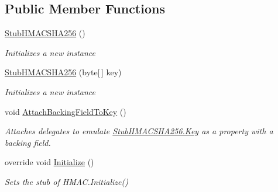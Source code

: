 \subsection*{Public Member Functions}
\begin{DoxyCompactItemize}
\item 
\hyperlink{class_system_1_1_security_1_1_cryptography_1_1_fakes_1_1_stub_h_m_a_c_s_h_a256_af42c7d7a032c40cf49c76c80475c7803}{Stub\-H\-M\-A\-C\-S\-H\-A256} ()
\begin{DoxyCompactList}\small\item\em Initializes a new instance\end{DoxyCompactList}\item 
\hyperlink{class_system_1_1_security_1_1_cryptography_1_1_fakes_1_1_stub_h_m_a_c_s_h_a256_a646a64414db785261bc084841fb2eba8}{Stub\-H\-M\-A\-C\-S\-H\-A256} (byte\mbox{[}$\,$\mbox{]} key)
\begin{DoxyCompactList}\small\item\em Initializes a new instance\end{DoxyCompactList}\item 
void \hyperlink{class_system_1_1_security_1_1_cryptography_1_1_fakes_1_1_stub_h_m_a_c_s_h_a256_a408cf9f63e60f236b141242b67e968c6}{Attach\-Backing\-Field\-To\-Key} ()
\begin{DoxyCompactList}\small\item\em Attaches delegates to emulate \hyperlink{class_system_1_1_security_1_1_cryptography_1_1_fakes_1_1_stub_h_m_a_c_s_h_a256_a4b753fa9484881923931ae50cd1667d7}{Stub\-H\-M\-A\-C\-S\-H\-A256.\-Key} as a property with a backing field.\end{DoxyCompactList}\item 
override void \hyperlink{class_system_1_1_security_1_1_cryptography_1_1_fakes_1_1_stub_h_m_a_c_s_h_a256_ac53cd4e632ab2a6008185346182185de}{Initialize} ()
\begin{DoxyCompactList}\small\item\em Sets the stub of H\-M\-A\-C.\-Initialize()\end{DoxyCompactList}\end{DoxyCompactItemize}
